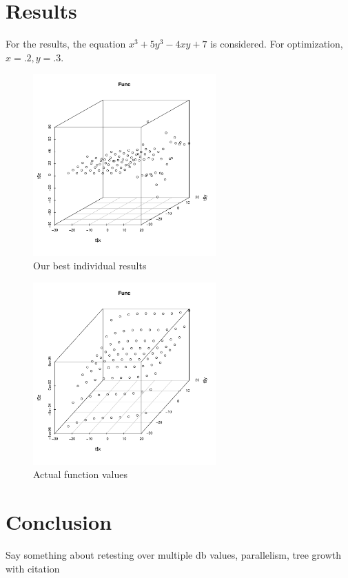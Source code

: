 \documentclass[12pt]{article}
\begin{document}
\pagebreak


\part{Results}
For the results, the equation $x^3 + 5y^3 - 4xy + 7$ is considered. For optimization, $ x = .2, y = .3$. 
\begin{figure}[!h]
        \begin{center}
		\includegraphics[width=70mm]{results.pdf}
               \caption{Our best individual results}
                \label{results}
        \end{center}
\end{figure}

\begin{figure}[!h]
        \begin{center}
		\includegraphics[width=70mm]{func.pdf}
               \caption{Actual function values}
                \label{results}
        \end{center}
\end{figure}

\part{Conclusion}
Say something about retesting over multiple db values, parallelism, tree growth with citation
\end{document}
